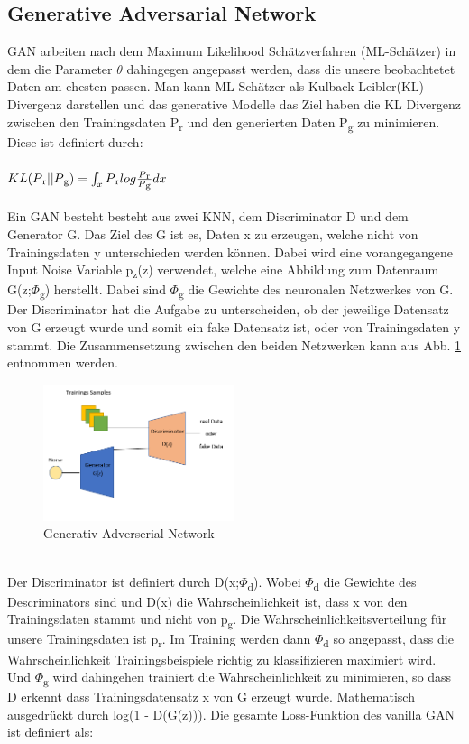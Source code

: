 \documentclass{llncs}
\begin{document}
\subsection{Generative Adversarial Network}
GAN arbeiten nach dem Maximum Likelihood Schätzverfahren (ML-Schätzer) in dem die Parameter $\theta$ dahingegen angepasst werden, dass die unsere beobachtetet Daten am ehesten passen. Man kann ML-Schätzer als Kulback-Leibler(KL) Divergenz darstellen und das generative Modelle das Ziel haben die KL Divergenz zwischen den Trainingsdaten P\textsubscript{r} und den generierten Daten P\textsubscript{g} zu minimieren. Diese ist definiert durch:
\\\\
\begin{math}
KL(P\textsubscript{r}||P\textsubscript{g})=\int_x P\textsubscript{r}log\frac{P\textsubscript{r}}{P\textsubscript{g}}dx                     
\end{math}
\\\\
Ein GAN besteht besteht aus zwei KNN, dem Discriminator D und dem Generator G. Das Ziel des G ist es, Daten x zu erzeugen, welche nicht von Trainingsdaten y unterschieden werden können. Dabei wird eine vorangegangene Input Noise Variable p\textsubscript{z}(z) verwendet, welche eine Abbildung zum Datenraum G(z;$\Phi$\textsubscript{g}) herstellt. Dabei sind $\Phi$\textsubscript{g} die Gewichte des neuronalen Netzwerkes von G. Der Discriminator hat die Aufgabe zu unterscheiden, ob der jeweilige Datensatz von G erzeugt wurde und somit ein fake Datensatz ist, oder von Trainingsdaten y stammt\cite{goodfellow2014}. Die Zusammensetzung zwischen den beiden Netzwerken kann aus Abb. \ref{fig:Bild20} entnommen werden.
\\
\begin{figure}[htbp] 
	\centering
	\includegraphics[width=0.5\textwidth]{GAN_GRUNDAUFBAU.png}
	\caption{Generativ Adverserial Network}
	\label{fig:Bild20}
\end{figure}
\\
Der Discriminator ist definiert durch D(x;$\Phi$\textsubscript{d}). Wobei $\Phi$\textsubscript{d} die Gewichte des Descriminators sind und D(x) die Wahrscheinlichkeit ist, dass x von den Trainingsdaten stammt und nicht von p\textsubscript{g}. Die Wahrscheinlichkeitsverteilung für unsere Trainingsdaten ist p\textsubscript{r}.  Im Training werden dann $\Phi$\textsubscript{d} so angepasst, dass die Wahrscheinlichkeit Trainingsbeispiele richtig zu klassifizieren maximiert wird. Und $\Phi$\textsubscript{g} wird dahingehen trainiert die Wahrscheinlichkeit zu minimieren, so dass D erkennt dass Trainingsdatensatz x von G erzeugt wurde. Mathematisch ausgedrückt durch log(1 - D(G(z))). Die gesamte Loss-Funktion des vanilla GAN ist definiert als:
\end{document}
